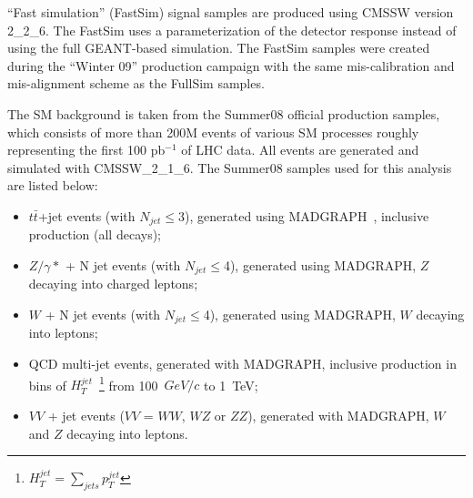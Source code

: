 ``Fast simulation'' (FastSim) signal samples are produced using CMSSW version 2\_2\_6.
The FastSim uses a parameterization of the detector response instead of using the full GEANT-based simulation.
The FastSim samples were created during the ``Winter 09'' production campaign with the same mis-calibration 
and mis-alignment scheme as the FullSim samples.

The SM background is taken from the Summer08 official production samples,
which consists of more than 200M events of various SM processes roughly representing 
the first 100 pb$^{-1}$ of LHC data. All events are generated and simulated with CMSSW\_2\_1\_6. 
The Summer08 samples used for this analysis are listed below:
\begin{itemize}
%
\item $t\bar{t}$+jet events (with $N_{jet}\le$3), generated using MADGRAPH~\cite{MADGRAPH}, inclusive production (all decays); 
%
\item $Z/\gamma*$ + N jet events (with $N_{jet}\le$4), generated using MADGRAPH, $Z$ decaying into charged leptons;  
%
\item $W$ + N jet events (with $N_{jet}\le$4), generated using MADGRAPH, $W$ decaying into leptons; 
%
\item QCD multi-jet events, generated with MADGRAPH, inclusive production in 
bins of $H_{T}^{jet}$~\footnote{$H_{T}^{jet}=\sum_{jets} p_T^{jet}$} from 100~$GeV/c$ to 1~TeV;  
%
%
\item $VV$ + jet events ($VV$ = $WW$, $WZ$ or $ZZ$), generated with MADGRAPH, 
$W$ and $Z$ decaying into leptons.
\end{itemize} 


